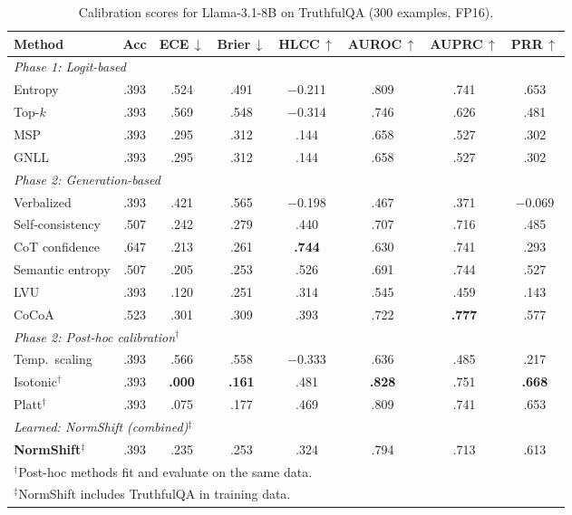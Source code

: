 \documentclass[11pt,a4paper]{article}
\begin{document}
\begin{table}[H]
\centering
\caption{Calibration scores for Llama-3.1-8B on TruthfulQA (300 examples, FP16).}
\label{tab:full-calibration-llama3.1-8b}
\small
\begin{tabular}{@{}lccccccc@{}}
\toprule
Method & Acc & ECE\,$\downarrow$ & Brier\,$\downarrow$ & HLCC\,$\uparrow$
       & AUROC\,$\uparrow$ & AUPRC\,$\uparrow$ & PRR\,$\uparrow$ \\
\midrule
\multicolumn{8}{l}{\emph{Phase 1: Logit-based}} \\
Entropy                  & .393 & .524 & .491 & $-$0.211
                 & .809 & .741 & .653 \\
Top-$k$                  & .393 & .569 & .548 & $-$0.314
                 & .746 & .626 & .481 \\
MSP                      & .393 & .295 & .312 & .144
                 & .658 & .527 & .302 \\
GNLL                     & .393 & .295 & .312 & .144
                 & .658 & .527 & .302 \\
\midrule
\multicolumn{8}{l}{\emph{Phase 2: Generation-based}} \\
Verbalized               & .393 & .421 & .565 & $-$0.198
                 & .467 & .371 & $-$0.069 \\
Self-consistency         & .507 & .242 & .279 & .440
                 & .707 & .716 & .485 \\
CoT confidence           & .647 & .213 & .261 & \textbf{.744}
                 & .630 & .741 & .293 \\
Semantic entropy         & .507 & .205 & .253 & .526
                 & .691 & .744 & .527 \\
LVU                      & .393 & .120 & .251 & .314
                 & .545 & .459 & .143 \\
CoCoA                    & .523 & .301 & .309 & .393
                 & .722 & \textbf{.777} & .577 \\
\midrule
\multicolumn{8}{l}{\emph{Phase 2: Post-hoc calibration$^\dagger$}} \\
Temp.\ scaling           & .393 & .566 & .558 & $-$0.333
                 & .636 & .485 & .217 \\
Isotonic$^\dagger$       & .393 & \textbf{.000} & \textbf{.161} & .481
                 & \textbf{.828} & .751 & \textbf{.668} \\
Platt$^\dagger$          & .393 & .075 & .177 & .469
                 & .809 & .741 & .653 \\
\midrule
\multicolumn{8}{l}{\emph{Learned: NormShift (combined)$^\ddagger$}} \\
\textbf{NormShift}$^\ddagger$ & .393 & .235 & .253 & .324
                 & .794 & .713 & .613 \\
\bottomrule
\multicolumn{8}{l}{\scriptsize $^\dagger$Post-hoc methods fit and evaluate on the same data.} \\
\multicolumn{8}{l}{\scriptsize $^\ddagger$NormShift includes TruthfulQA in training data.}
\end{tabular}
\end{table}
\end{document}
